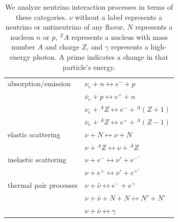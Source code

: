 \documentclass[aps,prd,twocolumn,superscriptaddress]{revtex4-1}
\begin{document}
\begin{table}%
  \caption{
    We analyze neutrino interaction processes in terms of these categories.
    $\nu$ without a label represents a neutrino or antineutrino of any flavor,
    $N$ represents a nucleon $n$ or $p$,
    ${}^ZA$ represents a nucleus with mass number $A$ and charge $Z$, and
    $\gamma$ represents a high-energy photon.
    A prime indicates a change in that particle's energy.
  }
  \label{tab:neutrino_processes}
  \begin{tabularx}{\columnwidth}{X X}
    \hline \hline
    absorption/emission
    & $\nu_e + n \leftrightarrow e^- + p$                          \\
    & $\bar{\nu}_e + p \leftrightarrow e^+ + n$                    \\
    & $\nu_e + {}^AZ \leftrightarrow e^- + {}^A(Z+1)$              \\
    & $\bar{\nu}_e + {}^AZ \leftrightarrow e^+ + {}^A(Z-1)$        \\
    \hline
    elastic scattering
    & $\nu + N \leftrightarrow \nu + N$                            \\
    & $\nu + {}^AZ \leftrightarrow \nu + {}^AZ$                    \\
    \hline
    inelastic scattering
    & $\nu + e^- \leftrightarrow \nu' + e^{-'}$                    \\
    & $\nu + e^+ \leftrightarrow \nu' + e^{+'}$                    \\
    \hline
    thermal pair processes
    & $\nu + \bar{\nu} \leftrightarrow e^{-} + e^{+}$              \\
    & $\nu + \bar{\nu} + N + N \leftrightarrow N' + N'$            \\
    & $\nu + \bar{\nu} \leftrightarrow \gamma$                     \\
    \hline \hline
  \end{tabularx}
\end{table}
\end{document}

